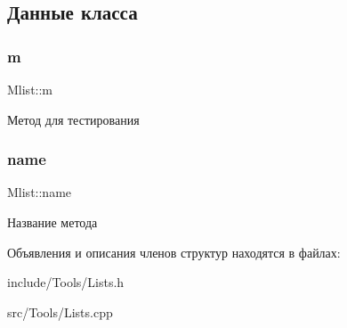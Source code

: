 \subsection{Данные класса}
\mbox{\label{structMlist_a0569033e58c295d725966143d61f4aa9}} 
\subsubsection{\texorpdfstring{m}{m}}
{\footnotesize\ttfamily Mlist\+::m}

Метод для тестирования \mbox{\label{structMlist_a4e0e04a40166dabf1343872f3466cf7a}} 
\subsubsection{\texorpdfstring{name}{name}}
{\footnotesize\ttfamily Mlist\+::name}

Название метода 

Объявления и описания членов структур находятся в файлах\+:\begin{DoxyCompactItemize}
\item 
include/\+Tools/Lists.\+h\item 
src/\+Tools/Lists.\+cpp\end{DoxyCompactItemize}
